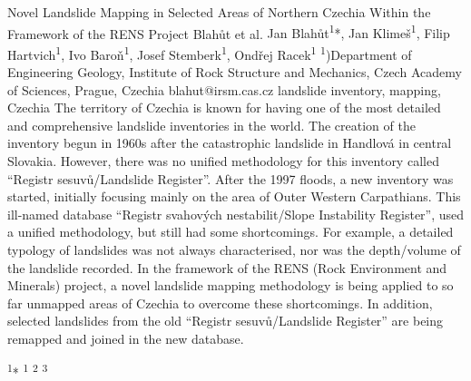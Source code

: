 \abstract
{Novel Landslide Mapping in Selected Areas of Northern Czechia Within the Framework of the RENS Project} 
{Blahůt et al.} 
{Jan Blahůt\textsuperscript{1}*, Jan Klimeš\textsuperscript{1}, Filip Hartvich\textsuperscript{1}, Ivo Baroň\textsuperscript{1}, Josef Stemberk\textsuperscript{1}, Ondřej Racek\textsuperscript{1}} 
{\POtag} 
{
\textsuperscript{1})Department of Engineering Geology, Institute of Rock Structure and Mechanics, Czech Academy of Sciences, Prague, Czechia
}
{blahut@irsm.cas.cz}  %
{landslide inventory, mapping, Czechia}
{The territory of Czechia is known for having one of the most detailed and comprehensive landslide inventories in the world. The creation of the inventory begun in 1960s after the catastrophic landslide in Handlová in central Slovakia. However, there was no unified methodology for this inventory called “Registr sesuvů/Landslide Register”. After the 1997 floods, a new inventory was started, initially focusing mainly on the area of Outer Western Carpathians. This ill-named database “Registr svahových nestabilit/Slope Instability Register”, used a unified methodology, but still had some shortcomings. For example, a detailed typology of landslides was not always characterised, nor was the depth/volume of the landslide recorded. In the framework of the RENS (Rock Environment and Minerals) project, a novel landslide mapping methodology is being applied to so far unmapped areas of Czechia to overcome these shortcomings. In addition, selected landslides from the old “Registr sesuvů/Landslide Register” are being remapped and joined in the new database. 
}
{
}



\abstract
{} 
{} 
{\textsuperscript{1}*} 
{\KLtag} 
{
	\textsuperscript{1}
	\textsuperscript{2}
	\textsuperscript{3}
}
{}  %
{}
{
}
{
}

